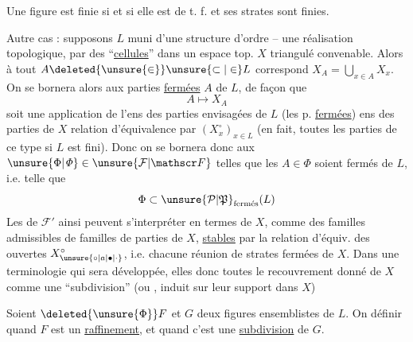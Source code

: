  Une figure est  finie  si et  si elle est de t. f. et ses strates sont finies.

Autre cas : supposons $L$ muni d'une structure d'ordre --    une réalisation topologique, par des ``\uline{cellules}''  dans un espace
top. $X$ triangulé convenable. Alors à tout $A\deleted{\unsure{\in}}\unsure{\subset|\in}L$ correspond  $X_A=\bigcup_{x\in A}X_x$.
On se bornera alors  aux parties \uline{fermées} $A$ de $L$, de façon que
\[ A\longmapsto X_A \]
soit une application  de l'ens des parties envisagées de $L$ (les p. \uline{fermées})
 ens des parties  de $X$    relation d'équivalence  par  $(X_x^\circ)_{x\in L}$ (en fait, toutes les parties
de ce type si $L$ est fini). Donc on se bornera donc aux $\unsure{\Phi|\mathit{\Phi}}\in\unsure{\mathcal F|\mathscr F}$ telles que les $A\in\Phi$ soient fermés de $L$, i.e. telle que
\[ \Phi\subset\unsure{\mathcal P|\mathfrak P}_{\text{fermés}}(L) \]
Les  de $\mathcal F'$ ainsi  peuvent s'interpréter en termes de $X$, comme des familles admissibles  de familles de
parties  de $X$,  \uline{stables} par la relation d'équiv. des   ouvertes $X_{\unsure{\circ|a|\bullet|\cdot}}^\circ$, i.e. chacune réunion de strates fermées de $X$.
Dans une terminologie qui sera développée, elles  donc toutes le recouvrement donné de $X$ comme une ``subdivision''\unsure{,|;} (ou ,  induit sur leur support dans $X$)


Soient $\deleted{\unsure{\Phi}}F$ et $G$ deux figures ensemblistes de $L$. On  définir quand $F$ est un \uline{raffinement}, et quand c'est une \uline{subdivision} de $G$.

